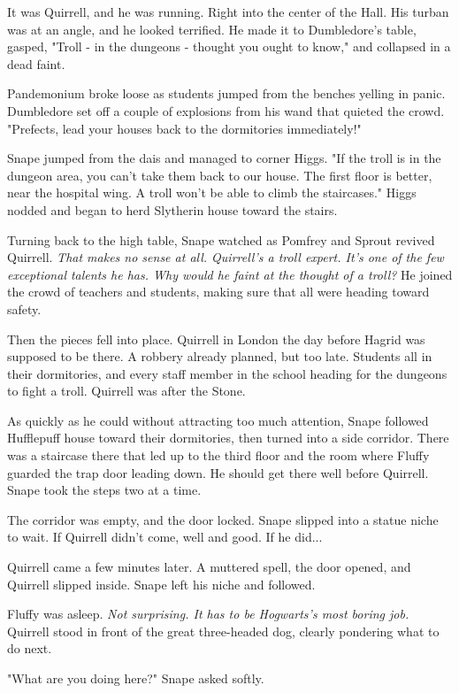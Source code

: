 It was Quirrell, and he was running. Right into the center of the Hall. His turban was at an angle, and he looked terrified. He made it to Dumbledore's table, gasped, "Troll - in the dungeons - thought you ought to know," and collapsed in a dead faint.

Pandemonium broke loose as students jumped from the benches yelling in panic. Dumbledore set off a couple of explosions from his wand that quieted the crowd. "Prefects, lead your houses back to the dormitories immediately!"

Snape jumped from the dais and managed to corner Higgs. "If the troll is in the dungeon area, you can't take them back to our house. The first floor is better, near the hospital wing. A troll won't be able to climb the staircases." Higgs nodded and began to herd Slytherin house toward the stairs.

Turning back to the high table, Snape watched as Pomfrey and Sprout revived Quirrell. \emph{That makes no sense at all. Quirrell's a troll expert. It's one of the few exceptional talents he has. Why would he faint at the thought of a troll?} He joined the crowd of teachers and students, making sure that all were heading toward safety.

Then the pieces fell into place. Quirrell in London the day before Hagrid was supposed to be there. A robbery already planned, but too late. Students all in their dormitories, and every staff member in the school heading for the dungeons to fight a troll. Quirrell was after the Stone.

As quickly as he could without attracting too much attention, Snape followed Hufflepuff house toward their dormitories, then turned into a side corridor. There was a staircase there that led up to the third floor and the room where Fluffy guarded the trap door leading down. He should get there well before Quirrell. Snape took the steps two at a time.

The corridor was empty, and the door locked. Snape slipped into a statue niche to wait. If Quirrell didn't come, well and good. If he did...

Quirrell came a few minutes later. A muttered spell, the door opened, and Quirrell slipped inside. Snape left his niche and followed.

Fluffy was asleep. \emph{Not surprising. It has to be Hogwarts's most boring job.} Quirrell stood in front of the great three-headed dog, clearly pondering what to do next.

"What are you doing here?" Snape asked softly.

